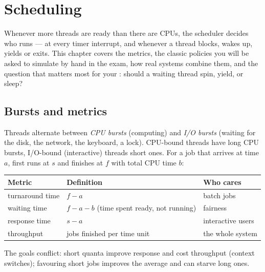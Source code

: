 \chapter{Scheduling}
\label{ch:scheduling}

Whenever more threads are ready than there are CPUs, the scheduler
decides who runs --- at every timer interrupt, and whenever a thread
blocks, wakes up, yields or exits. This chapter covers the metrics, the
classic policies you will be asked to simulate by hand in the exam, how
real systems combine them, and the question that matters most for your
: should a waiting thread spin, yield, or sleep?

\newcommand{\gantt}[1]{%
\begin{tikzpicture}[x=0.52cm,y=0.5cm,font=\scriptsize]
  \def\t{0}%
  \foreach \c [count=\i from 0] in {#1} {%
    \ifx\c.\draw (\i,0) rectangle ++(1,1);%
    \else\draw[fill=newbg] (\i,0) rectangle ++(1,1) node[pos=0.5] {\c};\fi
    \node[below] at (\i,0) {\i};
  }%
\end{tikzpicture}}

\section{Bursts and metrics}

Threads alternate between \emph{CPU bursts} (computing) and \emph{I/O
bursts} (waiting for the disk, the network, the keyboard, a lock).
CPU-bound threads have long CPU bursts, I/O-bound (interactive) threads
short ones. For a job that arrives at time $a$, first runs at $s$ and
finishes at $f$ with total CPU time $b$:

\begin{center}
\begin{tabular}{lll}
\toprule
\textbf{Metric} & \textbf{Definition} & \textbf{Who cares} \\
\midrule
turnaround time & $f - a$ & batch jobs \\
waiting time & $f - a - b$ (time spent ready, not running) & fairness \\
response time & $s - a$ & interactive users \\
throughput & jobs finished per time unit & the whole system \\
\bottomrule
\end{tabular}
\end{center}

The goals conflict: short quanta improve response and cost throughput
(context switches); favouring short jobs improves the average and can
starve long ones.

